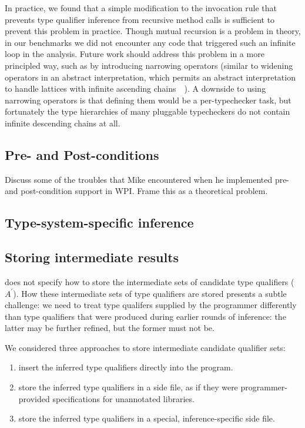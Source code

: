 In practice, we found that a simple modification to the invocation rule that
prevents type qualifier inference from recursive method calls is sufficient
to prevent this problem in practice.
%
Though mutual recursion is a problem in
theory, in our benchmarks we did not encounter any code that triggered such
an infinite loop in the analysis.
%
Future work should address this problem in
a more principled way, such as by introducing narrowing operators
(similar to widening operators in an abstract interpretation, which
permits an abstract interpretation to handle lattices with infinite
ascending chains~\cite{CousotC77:AI}~).
A downside to using narrowing operators is that defining them would
be a per-typechecker task, but fortunately the type hierarchies of many
pluggable typecheckers do not contain infinite descending chains at all.

\subsection{Pre- and Post-conditions}
\label{sec:pre-post-conditions}

Discuss some of the troubles that Mike encountered when
he implemented pre- and post-condition support in WPI\@. Frame
this as a theoretical problem. 


\subsection{Type-system-specific inference}
\label{sec:type-system-specific}


\subsection{Storing intermediate results}
\label{sec:output}


 does not specify how to store the intermediate
sets of candidate type qualifiers (\ie $A^{\prime}$). How these intermediate
sets of type qualifiers are stored presents a subtle challenge: we need
to treat type qualifers supplied by the programmer differently than
type qualifiers that were produced during earlier rounds of inference:
the latter may be further refined, but the former must not be.

We considered three approaches to store intermediate candidate qualifier sets:
\begin{enumerate}
\item insert the inferred type qualifiers directly into the program.
\item store the inferred type qualifiers in a side file, as if they were
  programmer-provided specifications for unannotated libraries.
\item store the inferred type qualifiers in a special, inference-specific
  side file.
\end{enumerate}

